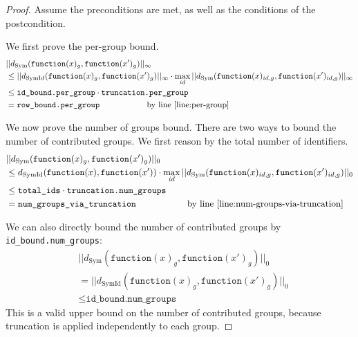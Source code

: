 \documentclass{article}
\begin{document}
\begin{proof}
    Assume the preconditions are met, as well as the conditions of the postcondition.

    We first prove the per-group bound.
    \begin{align*}
        &||d_{\mathrm{Sym}}(\texttt{function}(x)_{g}, \texttt{function}(x')_{g})||_\infty \\
        &\le ||d_{\mathrm{SymId}}(\texttt{function}(x)_{g}, \texttt{function}(x')_{g})||_\infty \cdot \max_{id} ||d_{\mathrm{Sym}}(\texttt{function}(x)_{id,g}, \texttt{function}(x')_{id,g})||_\infty \\
        &\le \texttt{id\_bound.per\_group} \cdot \texttt{truncation.per\_group}\\
        &= \texttt{row\_bound.per\_group} \hspace{2cm} \text{by line } \ref{line:per-group}
    \end{align*}
    
    We now prove the number of groups bound.
    There are two ways to bound the number of contributed groups.
    We first reason by the total number of identifiers.
    \begin{align*}
        &||d_{\mathrm{Sym}}(\texttt{function}(x)_{g}, \texttt{function}(x')_{g})||_0 \\
        &\le d_{\mathrm{SymId}}(\texttt{function}(x), \texttt{function}(x')) \cdot \max_{id} ||d_{\mathrm{Sym}}(\texttt{function}(x)_{id,g}, \texttt{function}(x')_{id,g})||_0 \\
        &\le \texttt{total\_ids} \cdot \texttt{truncation.num\_groups} \\
        &= \texttt{num\_groups\_via\_truncation} \hspace{2cm} \text{by line } \ref{line:num-groups-via-truncation}
    \end{align*}

    We can also directly bound the number of contributed groups by \texttt{id\_bound.num\_groups}:
    \begin{align*}
        &||d_{\mathrm{Sym}}(\texttt{function}(x)_{g}, \texttt{function}(x')_{g})||_0 \\
        &= ||d_{\mathrm{SymId}}(\texttt{function}(x)_{g}, \texttt{function}(x')_{g})||_0 \\
        &\le \texttt{id\_bound.num\_groups}
    \end{align*}
    This is a valid upper bound on the number of contributed groups, because truncation is applied independently to each group.


\end{proof}
\end{document}
